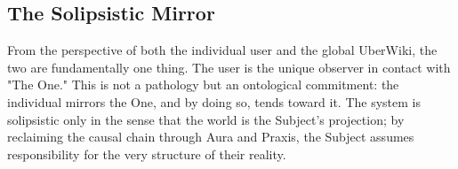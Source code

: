 \subsection{The Solipsistic Mirror}
From the perspective of both the individual user and the global UberWiki, the two are fundamentally one thing. The user is the unique observer in contact with "The One." This is not a pathology but an ontological commitment: the individual mirrors the One, and by doing so, tends toward it. The system is solipsistic only in the sense that the world is the Subject's projection; by reclaiming the causal chain through Aura and Praxis, the Subject assumes responsibility for the very structure of their reality.
